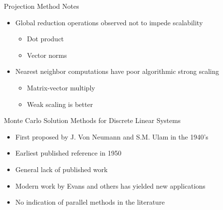 \documentclass{beamer}
\begin{document}
\begin{frame}{Projection Method Notes}

\begin{itemize}
  \item Global reduction operations observed not to impede scalability
    \begin{itemize}
    \item Dot product
    \item Vector norms
    \end{itemize}
  \item Nearest neighbor computations have poor algorithmic strong
    scaling
    \begin{itemize}
      \item Matrix-vector multiply
      \item Weak scaling is better
    \end{itemize}
   
\end{itemize}

\end{frame}

\begin{frame}{Monte Carlo Solution Methods for Discrete Linear Systems}

  \begin{itemize}
    \item First proposed by J. Von Neumann and S.M. Ulam in the 1940's
    \item Earliest published reference in 1950
    \item General lack of published work
    \item Modern work by Evans and others has yielded new applications
    \item No indication of parallel methods in the literature
  \end{itemize}
\end{frame}
\end{document}
